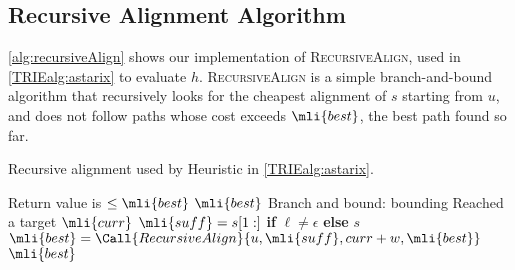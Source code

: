 \subsection{Recursive Alignment Algorithm} \label{app:recursive-align}
\cref{alg:recursiveAlign} shows our implementation of \textsc{RecursiveAlign},
used in \cref{TRIEalg:astarix} to evaluate $h$. \textsc{RecursiveAlign} is a simple
branch-and-bound algorithm that recursively looks for the cheapest alignment of
$s$ starting from $u$, and does not follow paths whose cost exceeds
$\mli{best}$, the best path found so far.

\begin{algorithm}[H]
	\caption{Recursive alignment used by Heuristic in \cref{TRIEalg:astarix}.}\label{alg:recursiveAlign}
	\begin{algorithmic}[1]
		\Statex
			 \Comment
			Return value is $\leq \mli{best}$
				\State \Return $\mli{best}$
				\Comment Branch and bound: bounding
			\EndIf
				\Comment Reached a target
				\State \Return $\mli{curr}$
			\EndIf
				\State $\mli{suff} = s[1:]$ \textbf{if} $\ell \neq \epsilon$ \textbf{else} $s$
				\State $\mli{best} = \Call{RecursiveAlign}{u, \mli{suff}, curr + w, \mli{best}}$
			\EndFor
			\State \Return $\mli{best}$
		\EndFunction
	\end{algorithmic}
\end{algorithm}

